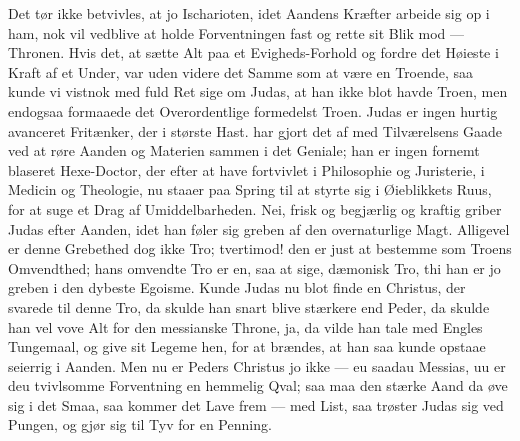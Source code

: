 \documentclass[12pt,a4paper]{book}
\begin{document}
Det tør ikke betvivles, at jo Ischarioten, idet Aandens Kræfter arbeide sig op i ham, nok vil
vedblive at holde Forventningen fast og rette sit Blik mod --- Thronen. Hvis det, at sætte
Alt paa et Evigheds-Forhold og fordre det Høieste i Kraft af et Under, var uden videre det
Samme som at være en Troende, saa kunde vi vistnok med fuld Ret sige om Judas, at han ikke
blot havde Troen, men endogsaa formaaede det Overordentlige formedelst Troen. Judas er ingen
hurtig avanceret Fritænker, der i største Hast. har gjort det af med Tilværelsens Gaade ved
at røre Aanden og Materien sammen i det Geniale; han er ingen fornemt blaseret Hexe-Doctor,
der efter at have fortvivlet i Philosophie og Juristerie, i Medicin og Theologie, nu staaer
paa Spring til at styrte sig i Øieblikkets Ruus, for at suge et Drag af Umiddelbarheden. Nei,
frisk og begjærlig og kraftig griber Judas efter Aanden, idet
han føler sig greben af den overnaturlige Magt. Alligevel er denne Grebethed dog ikke Tro;
tvertimod! den er just at bestemme som Troens Omvendthed; hans omvendte Tro er en, saa at
sige, dæmonisk Tro, thi han er jo greben i den dybeste Egoisme. Kunde Judas nu blot finde en
Christus, der svarede til denne Tro, da skulde han snart blive stærkere end Peder, da skulde
han vel vove Alt for den messianske Throne, ja, da vilde han tale med Engles Tungemaal, og
give sit Legeme hen, for at brændes, at han saa kunde opstaae seierrig i Aanden. Men nu er
Peders Christus jo ikke --- eu saadau Messias, uu er deu tvivlsomme Forventning en hemmelig
Qval; saa maa den stærke Aand da øve sig i det Smaa, saa kommer det Lave frem --- med List,
saa trøster Judas sig ved Pungen, og gjør sig til Tyv for en Penning.
\end{document}
